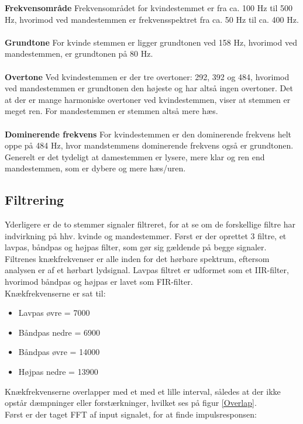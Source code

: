 \textbf{Frekvensområde}
Frekvensområdet for kvindestemmet er fra ca. 100 Hz til 500 Hz, hvorimod ved mandestemmen er frekvensspektret fra ca. 50 Hz til ca. 400 Hz.\\ \\
\textbf{Grundtone}
For kvinde stemmen er ligger grundtonen ved 158 Hz, hvorimod ved mandestemmen, er grundtonen på 80 Hz. \\
\\
\textbf{Overtone}
Ved kvindestemmen er der tre overtoner: 292, 392 og 484, hvorimod ved mandestemmen er grundtonen den højeste og har altså ingen overtoner. Det at der er mange harmoniske overtoner ved kvindestemmen, viser at stemmen er meget ren. For mandestemmen er stemmen altså mere hæs.\\
\\
\textbf{Dominerende frekvens}
For kvindestemmen er den dominerende frekvens helt oppe på 484 Hz, hvor mandstemmens dominerende frekvens også er grundtonen.
Generelt er det tydeligt at damestemmen er lysere, mere klar og ren end mandestemmen, som er dybere og mere hæs/uren.

\subsection{Filtrering}
Yderligere er de to stemmer signaler filtreret, for at se om de forskellige filtre har indvirkning på hhv. kvinde og mandestemmer.
Først er der oprettet 3 filtre, et lavpas, båndpas og højpas filter, som gør sig gældende på begge signaler. Filtrenes knækfrekvenser er alle inden for det hørbare spektrum, eftersom analysen er af et hørbart lydsignal. Lavpas filtret er udformet som et IIR-filter, hvorimod båndpas og højpas er lavet som FIR-filter.\\Knækfrekvenserne er sat til:
\begin{itemize}
	\item Lavpas øvre = 7000
	\item Båndpas nedre = 6900
	\item Båndpas øvre = 14000
	\item Højpas nedre = 13900
\end{itemize}
Knækfrekvenserne overlapper med et med et lille interval, således at der ikke opstår dæmpninger eller forstærkninger, hvilket ses på figur \ref{Overlap}.\\
Først er der taget FFT af input signalet, for at finde impulsresponsen:


